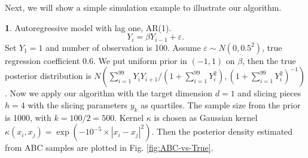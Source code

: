 \documentclass[oneside,english]{amsbook}
\numberwithin{section}{chapter}
\numberwithin{equation}{section}
\numberwithin{figure}{section}
\theoremstyle{plain}
\theoremstyle{plain}
\theoremstyle{definition}
\theoremstyle{plain}
\theoremstyle{plain}
\theoremstyle{remark}
\theoremstyle{definition}
\newtheorem{example}{\protect\examplename}
\theoremstyle{definition}
\providecommand{\examplename}{Example}
\begin{document}
Next, we will show a simple simulation example to illustrate our algorithm.
\begin{example}
Autoregressive model with lag one, AR(1). 
\[
Y_{i}=\beta Y_{i-1}+\varepsilon.
\]
Set $Y_{1}=1$ and number of observation is 100. Assume $\varepsilon\sim N\left(0,0.5^{2}\right)$,
true regression coefficient 0.6. We put uniform prior in $\left(-1,1\right)$
on $\beta$, then the true posterior distribution is $N\left(\sum_{i=1}^{99}Y_{i}Y_{i+1}/\left(1+\sum_{i=1}^{99}Y_{i}^{2}\right),\left(1+\sum_{i=1}^{99}Y_{i}^{2}\right)^{-1}\right)$.
Now we apply our algorithm with the target dimension $d=1$ and slicing
pieces $h=4$ with the slicing parameters $y_{k}$ as quartiles. The
sample size from the prior is 1000, with $k=100/2=500$. Kernel $\kappa$
is chosen as Gaussian kernel $\kappa\left(x_{i},x_{j}\right)=\exp\left(-10^{-5}\times |x_{i}-x_{j} |^{2}\right)$.
Then the posterior density estimated from ABC samples are plotted
in Fig. \ref{fig:ABC-vs-True}. %

\end{example}
\end{document}
